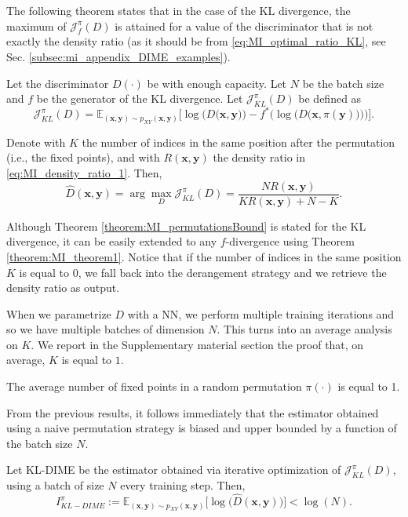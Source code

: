 The following theorem states that in the case of the KL divergence, the maximum of $\mathcal{J}_{f}^{\pi}(D)$ is attained for a  value of the discriminator that is not exactly the density ratio (as it should be from \eqref{eq:MI_optimal_ratio_KL}, see Sec. \ref{subsec:mi_appendix_DIME_examples}).

\begin{theorem}
\label{theorem:MI_permutationsBound}
Let the discriminator $D(\cdot)$ be with enough capacity. Let $N$ be the batch size and $f$ be the generator of the KL divergence. Let $\mathcal{J}_{KL}^{\pi}(D)$ be defined as
\begin{equation}
\mathcal{J}_{KL}^{\pi}(D) =  \mathbb{E}_{(\mathbf{x},\mathbf{y}) \sim p_{XY}(\mathbf{x},\mathbf{y})}\biggl[\log\biggl(D\bigl(\mathbf{x},\mathbf{y}\bigr)\biggr)-f^*\biggl(\log\biggl(D\bigl(\mathbf{x},\pi(\mathbf{y})\bigr)\biggr)\biggr)\biggr].
\label{eq:MI_discriminator_function_perm_KL}
\end{equation}

Denote with $K$ the number of indices in the same position after the permutation (i.e., the fixed points), and with $R(\mathbf{x},\mathbf{y})$ the density ratio in \eqref{eq:MI_density_ratio_1}.
Then,
\begin{equation}
\label{eq:MI_optimal_ratio_perm_KL}
\hat{D}(\mathbf{x},\mathbf{y}) =\arg \max_D \mathcal{J}_{KL}^{\pi}(D) = \frac{NR(\mathbf{x},\mathbf{y})}{KR(\mathbf{x},\mathbf{y})+N-K}.
\end{equation}
\end{theorem}
Although Theorem \ref{theorem:MI_permutationsBound} is stated for the KL divergence, it can be easily extended to any $f$-divergence using Theorem \ref{theorem:MI_theorem1}. Notice that if the number of indices in the same position $K$ is equal to $0$, we fall back into the derangement strategy and we retrieve the density ratio as output. 

When we parametrize $D$ with a NN, we perform multiple training iterations and so we have multiple batches of dimension $N$. This turns into an average analysis on $K$. We report in the Supplementary material section the proof that, on average, $K$ is equal to $1$.
\begin{lemma}
\label{lemma:MI_M=1}
The average number of fixed points in a random permutation $\pi(\cdot)$ is equal to 1.
\end{lemma}

From the previous results, it follows immediately that the estimator obtained using a naive permutation strategy is biased and upper bounded by a function of the batch size $N$.  
\begin{corollary}
\label{corollary:MI_permutationsUpperBound}
Let KL-DIME be the estimator obtained via iterative optimization of $\mathcal{J}_{KL}^{\pi}(D)$, using a batch of size $N$ every training step. Then,
\begin{equation}
    I_{KL-DIME}^{\pi} := \mathbb{E}_{(\mathbf{x},\mathbf{y}) \sim p_{XY}(\mathbf{x},\mathbf{y})}\biggl[ \log \biggl(\hat{D}(\mathbf{x},\mathbf{y})\biggr) \biggr] < \log(N).
\end{equation}
\end{corollary}

